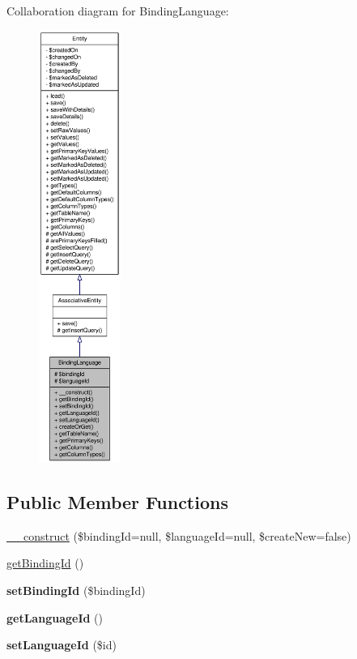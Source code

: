 Collaboration diagram for BindingLanguage:\nopagebreak
\begin{figure}[H]
\begin{center}
\leavevmode
\includegraphics[height=400pt]{classBindingLanguage__coll__graph}
\end{center}
\end{figure}
\subsection*{Public Member Functions}
\begin{DoxyCompactItemize}
\item 
\hyperlink{classBindingLanguage_a82d72a86b098f9d6ee3d11412f566674}{\_\-\_\-construct} (\$bindingId=null, \$languageId=null, \$createNew=false)
\item 
\hyperlink{classBindingLanguage_a3ddbcd10fe8a242eeac058c4f37b2363}{getBindingId} ()
\item 
\hypertarget{classBindingLanguage_a1466d54d63341b0b1097e0a7d772de41}{
{\bfseries setBindingId} (\$bindingId)}
\label{classBindingLanguage_a1466d54d63341b0b1097e0a7d772de41}

\item 
\hypertarget{classBindingLanguage_a128bbc4c6acaec2dc54f77b7d7e77d38}{
{\bfseries getLanguageId} ()}
\label{classBindingLanguage_a128bbc4c6acaec2dc54f77b7d7e77d38}

\item 
\hypertarget{classBindingLanguage_a049a0c51d0b71ce2235f6a87052f2107}{
{\bfseries setLanguageId} (\$id)}
\label{classBindingLanguage_a049a0c51d0b71ce2235f6a87052f2107}

\end{DoxyCompactItemize}
